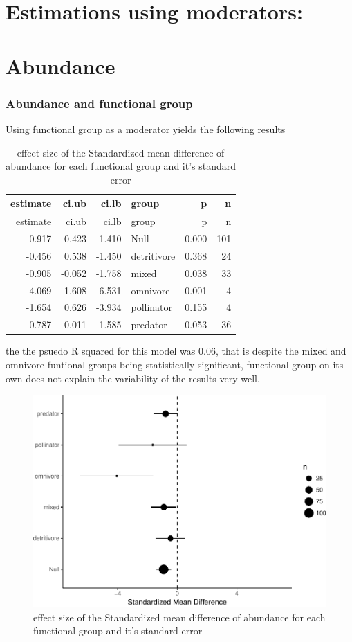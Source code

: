 \documentclass[]{elsarticle} %
\makeatletter
\def\maxwidth{\ifdim\Gin@nat@width>\linewidth\linewidth
\else\Gin@nat@width\fi}
\let\Oldincludegraphics\includegraphics
\renewcommand{\includegraphics}[1]{\Oldincludegraphics[width=\maxwidth]{#1}}
\makeatother
\begin{document}
\section{Estimations using
moderators:}\label{estimations-using-moderators}

\section{Abundance}\label{abundance}

\subsubsection{Abundance and functional
group}\label{abundance-and-functional-group}

Using functional group as a moderator yields the following results

\begin{longtable}[c]{@{}rrrlrr@{}}
\caption{effect size of the Standardized mean difference of abundance
for each functional group and it's standard error}\tabularnewline
\toprule
estimate & ci.ub & ci.lb & group & p & n\tabularnewline
\midrule
\endfirsthead
\toprule
estimate & ci.ub & ci.lb & group & p & n\tabularnewline
\midrule
\endhead
-0.917 & -0.423 & -1.410 & Null & 0.000 & 101\tabularnewline
-0.456 & 0.538 & -1.450 & detritivore & 0.368 & 24\tabularnewline
-0.905 & -0.052 & -1.758 & mixed & 0.038 & 33\tabularnewline
-4.069 & -1.608 & -6.531 & omnivore & 0.001 & 4\tabularnewline
-1.654 & 0.626 & -3.934 & pollinator & 0.155 & 4\tabularnewline
-0.787 & 0.011 & -1.585 & predator & 0.053 & 36\tabularnewline
\bottomrule
\end{longtable}

the the psuedo R squared for this model was 0.06, that is despite the
mixed and omnivore funtional groups being statistically significant,
functional group on its own does not explain the variability of the
results very well.

\begin{figure}[htbp]
\centering
\includegraphics{MetanalysisNeonics_files/figure-latex/unnamed-chunk-6-1.pdf}
\caption{effect size of the Standardized mean difference of abundance
for each functional group and it's standard error}
\end{figure}
\end{document}
